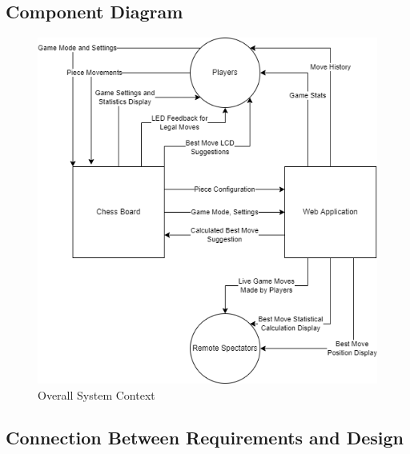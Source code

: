 \documentclass[12pt, titlepage]{article}
\begin{document}
\subsection{Component Diagram}
\begin{figure}[H]
  \begin{center}
    \includegraphics[scale=0.65]{chess-connect-system-context.png}
    \caption{Overall System Context}
    \label{Fig_SystemContext} 
  \end{center}
\end{figure}


\subsection{Connection Between Requirements and Design} \label{SecConnection}
\end{document}
